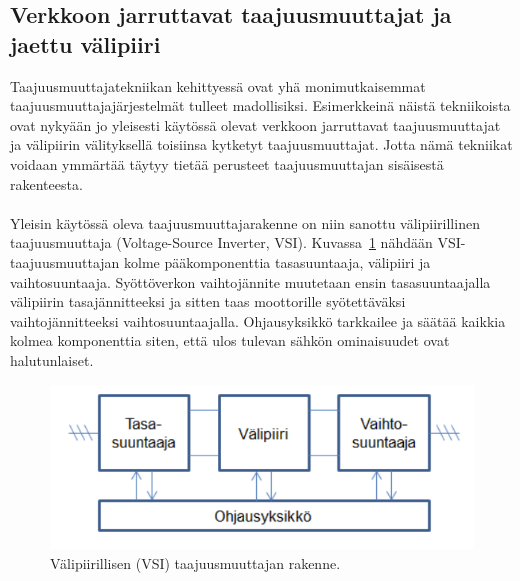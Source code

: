 \documentclass[finnish,12pt,a4paper,pdftex,elec,utf8]{aaltothesis}
\begin{document}






\subsection{Verkkoon jarruttavat taajuusmuuttajat ja jaettu välipiiri}
Taajuusmuuttajatekniikan kehittyessä ovat yhä monimutkaisemmat taajuusmuuttajajärjestelmät tulleet madollisiksi. Esimerkkeinä näistä tekniikoista ovat nykyään jo yleisesti käytössä olevat verkkoon jarruttavat taajuusmuuttajat ja välipiirin välityksellä toisiinsa kytketyt taajuusmuuttajat. Jotta nämä tekniikat voidaan ymmärtää täytyy tietää perusteet taajuusmuuttajan sisäisestä rakenteesta.
\\\\
Yleisin käytössä oleva taajuusmuuttajarakenne on niin sanottu välipiirillinen taajuusmuuttaja (Voltage-Source Inverter, VSI). Kuvassa~\ref{fig:VSI} nähdään VSI-taajuusmuuttajan kolme pääkomponenttia tasasuuntaaja, välipiiri ja vaihtosuuntaaja. Syöttöverkon vaihtojännite muutetaan ensin tasasuuntaajalla välipiirin tasajännitteeksi ja sitten taas moottorille syötettäväksi vaihtojännitteeksi vaihtosuuntaajalla. Ohjausyksikkö tarkkailee ja säätää kaikkia kolmea komponenttia siten, että ulos tulevan sähkön ominaisuudet ovat halutunlaiset.

\begin{figure}[H]
	\begin{center}
	\includegraphics[scale=0.65]{VSI}
	\end{center}
	\caption{Välipiirillisen (VSI) taajuusmuuttajan rakenne.
		\cite[s. 2]{VSI}}
	\label{fig:VSI}
\end{figure}
\end{document}
